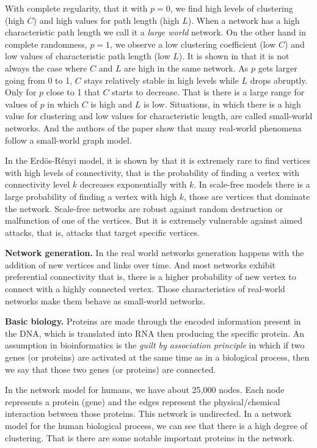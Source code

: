 \documentclass[9pt,a4paper]{article}
\begin{document}
With complete regularity, that it with $p=0$, we find high levels of clustering (high $C$) and high values for path length (high $L$). When a network has a high characteristic path length we call it a \textit{large world} network. 
On the other hand in complete randomness, $p=1$, we observe a low clustering coefficient (low $C$) and low values of characteristic path length (low $L$). 
It is shown in \cite{watts_strogatz_1998} that it is not always the case where $C$ and $L$ are high in the same network.
As $p$ gets larger going from 0 to 1, $C$ stays relatively stable in high levels while $L$ drops abruptly. Only for $p$ close to 1 that $C$ starts to decrease. 
That is there is a large range for values of $p$ in which $C$ is high and $L$ is low. 
Situations, in which there is a high value for clustering and low values for characteristic length, are called small-world networks. And the authors of the paper show that many real-world phenomena follow a small-world graph model.

In the Erdös-Rényi model, it is shown by \cite{barbasi_albert_1999} that it is extremely rare to find vertices with high levels of connectivity, that is the probability of finding a vertex with connectivity level $k$ decreases exponentially with $k$.
In scale-free models there is a large probability of finding a vertex with high $k$, those are vertices that dominate the network.
Scale-free networks are robust against random destruction or malfunction of one of the vertices. 
But it is extremely vulnerable against aimed attacks, that is, attacks that target specific vertices.

\textbf{Network generation.} In the real world networks generation happens with the addition of new vertices and links over time. And most networks exhibit preferential connectivity that is, there is a higher probability of new vertex to connect with a highly connected vertex. Those characteristics of real-world networks make them behave as small-world networks.

\textbf{Basic biology.} Proteins are made through the encoded information present in the DNA, which is translated into RNA then producing the specific protein.
An assumption in bioinformatics is the \textit{guilt by association principle} in which if two genes (or proteins) are activated at the same time as in a biological process, then we say that those two genes (or proteins) are connected.

In the network model for humans, we have about 25,000 nodes. Each node represents a protein (gene) and the edges represent the physical/chemical interaction between those proteins. This network is undirected. In a network model for the human biological process, we can see that there is a high degree of clustering. That is there are some notable important proteins in the network.
\end{document}
